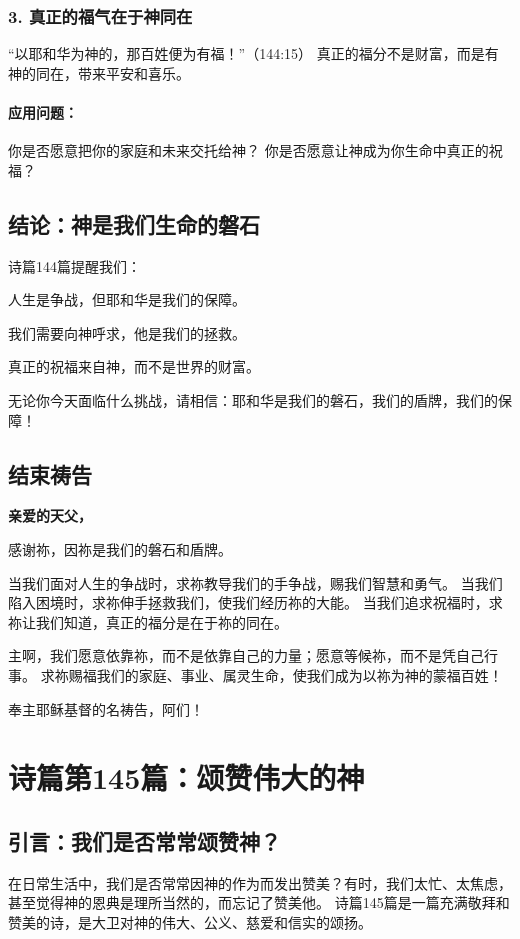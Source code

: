 \documentclass[a4paper, 12pt]{article}
\begin{document}
\subsubsection*{3. 真正的福气在于神同在}
“以耶和华为神的，那百姓便为有福！”（144:15）
真正的福分不是财富，而是有神的同在，带来平安和喜乐。
\paragraph*{应用问题：}
你是否愿意把你的家庭和未来交托给神？
你是否愿意让神成为你生命中真正的祝福？
\subsection*{结论：神是我们生命的磐石}
诗篇144篇提醒我们：

人生是争战，但耶和华是我们的保障。

我们需要向神呼求，他是我们的拯救。

真正的祝福来自神，而不是世界的财富。

无论你今天面临什么挑战，请相信：耶和华是我们的磐石，我们的盾牌，我们的保障！

\subsection*{结束祷告}
\textbf{亲爱的天父，}

感谢祢，因祢是我们的磐石和盾牌。

当我们面对人生的争战时，求祢教导我们的手争战，赐我们智慧和勇气。
当我们陷入困境时，求祢伸手拯救我们，使我们经历祢的大能。
当我们追求祝福时，求祢让我们知道，真正的福分是在于祢的同在。

主啊，我们愿意依靠祢，而不是依靠自己的力量；愿意等候祢，而不是凭自己行事。
求祢赐福我们的家庭、事业、属灵生命，使我们成为以祢为神的蒙福百姓！

奉主耶稣基督的名祷告，阿们！
\newpage
\section{诗篇第145篇：颂赞伟大的神}
\subsection*{引言：我们是否常常颂赞神？}
在日常生活中，我们是否常常因神的作为而发出赞美？有时，我们太忙、太焦虑，甚至觉得神的恩典是理所当然的，而忘记了赞美他。
诗篇145篇是一篇充满敬拜和赞美的诗，是大卫对神的伟大、公义、慈爱和信实的颂扬。
\end{document}
